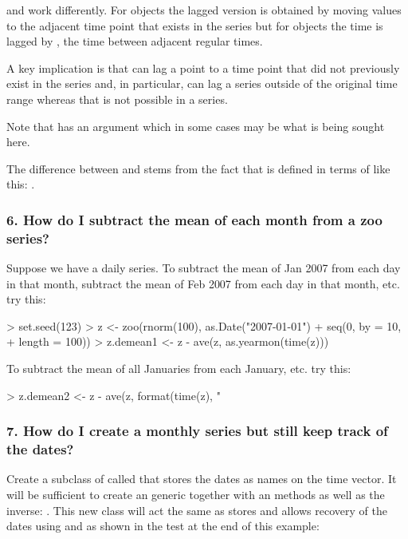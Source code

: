 \documentclass{Z}
\newcommand{\mysection}[1]{\subsubsection[#1]{\textbf{#1}}}
\begin{document}
 and  work differently.  For 
objects the lagged version is obtained by moving values 
to the adjacent time point that exists in the series but for  
objects the time is lagged by , the time between adjacent
regular times.

A key implication is that  can lag a point to a time point
that did not previously exist in the series and, in particular, can lag
a series outside of the original time range whereas that is not possible
in a  series.

Note that  has an  argument which in some
cases may be what is being sought here.

The difference between  and  stems from
the fact that  is defined in terms of  like
this: .

\mysection{6. How do I subtract the mean of each month from a zoo series?}

Suppose we have a daily series.
To subtract the mean of Jan 2007 from each day in that month,
subtract the mean of Feb 2007 from each day in that month, etc.
try this:
     
\begin{Schunk}
\begin{Sinput}
> set.seed(123)
> z <- zoo(rnorm(100), as.Date("2007-01-01") + seq(0, by = 10, 
+     length = 100))
> z.demean1 <- z - ave(z, as.yearmon(time(z)))
\end{Sinput}
\end{Schunk}

To subtract the mean of all Januaries from each January, etc.
try this:

\begin{Schunk}
\begin{Sinput}
> z.demean2 <- z - ave(z, format(time(z), "%
\end{Sinput}
\end{Schunk}

\mysection{7. How do I create a monthly series but still keep track of the dates?}

Create a  subclass of  called  that 
stores the dates as names on the time vector.  It will be sufficient to create
an  generic together with an
 methods as well as the inverse:
.
This new class will act the same as  
stores and allows recovery of the dates using  and
 as shown in the test at the end of this example:
\end{document}

